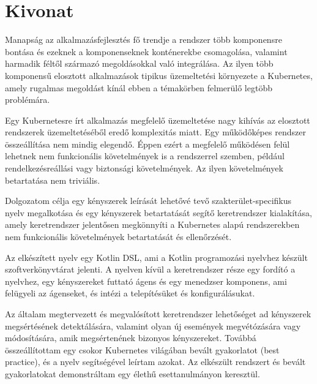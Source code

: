 \setcounter{page}{1}

\selecthungarian

\setlength{\parindent}{0pt}
\setlength{\parskip}{0.6em}

\chapter*{Kivonat}

Manapság az alkalmazásfejlesztés fő trendje a rendszer több komponensre bontása és ezeknek a komponenseknek konténerekbe csomagolása, valamint harmadik féltől származó megoldásokkal való integrálása. Az ilyen több komponensű elosztott alkalmazások tipikus üzemeltetési környezete a Kubernetes, amely rugalmas megoldást kínál ebben a témakörben felmerülő legtöbb problémára.

Egy Kubernetesre írt alkalmazás megfelelő üzemeltetése nagy kihívás az elosztott rendszerek üzemeltetéséből eredő komplexitás miatt. Egy működőképes rendszer összeállítása nem mindig elegendő. Éppen ezért a megfelelő működésen felül lehetnek nem funkcionális követelmények is a rendszerrel szemben, például rendelkezésreállási vagy biztonsági követelmények. Az ilyen követelmények betartatása nem triviális.

Dolgozatom célja egy kényszerek leírását lehetővé tevő szakterület-specifikus nyelv megalkotása és egy kényszerek betartatását segítő keretrendszer kialakítása, amely keretrendszer jelentősen megkönnyíti a Kubernetes alapú rendszerekben nem funkcionális követelmények betartatását és ellenőrzését.

Az elkészített nyelv egy Kotlin DSL, ami a Kotlin programozási nyelvhez készült szoftverkönyvtárat jelenti. A nyelven kívül a keretrendszer része egy fordító a nyelvhez, egy kényszereket futtató ágens és egy menedzser komponens, ami felügyeli az ágenseket, és intézi a telepítésüket és konfigurálásukat.

Az általam megtervezett és megvalósított keretrendszer lehetőséget ad kényszerek megsértésének detektálására, valamint olyan új események megvétózására vagy módosítására, amik megsértenének bizonyos kényszereket. Továbbá összeállítottam egy csokor Kubernetes világában bevált gyakorlatot (best practice), és a nyelv segítségével leírtam azokat. Az elkészült rendszert és bevált gyakorlatokat demonstráltam egy élethű esettanulmányon keresztül.

